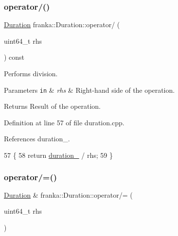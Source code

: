\subsubsection{\texorpdfstring{operator/()}{operator/()}\hspace{0.1cm}{\footnotesize\ttfamily [2/2]}}
{\footnotesize\ttfamily \hyperlink{classfranka_1_1Duration}{Duration} franka\+::\+Duration\+::operator/ (\begin{DoxyParamCaption}\item[{uint64\+\_\+t}]{rhs }\end{DoxyParamCaption}) const\hspace{0.3cm}{\ttfamily [noexcept]}}

Performs division.


\begin{DoxyParams}[1]{Parameters}
\mbox{\tt in}  & {\em rhs} & Right-\/hand side of the operation.\\
\hline
\end{DoxyParams}
\begin{DoxyReturn}{Returns}
Result of the operation. 
\end{DoxyReturn}


Definition at line 57 of file duration.\+cpp.



References duration\+\_\+.


\begin{DoxyCode}
57                                                         \{
58   \textcolor{keywordflow}{return} \hyperlink{classfranka_1_1Duration_ae446c403b200f0dbf92fb51ca21e82ff}{duration\_} / rhs;
59 \}
\end{DoxyCode}
\mbox{\label{classfranka_1_1Duration_a827f1d0177d06f51c55e56f540db02f8}} 
\subsubsection{\texorpdfstring{operator/=()}{operator/=()}}
{\footnotesize\ttfamily \hyperlink{classfranka_1_1Duration}{Duration} \& franka\+::\+Duration\+::operator/= (\begin{DoxyParamCaption}\item[{uint64\+\_\+t}]{rhs }\end{DoxyParamCaption})\hspace{0.3cm}{\ttfamily [noexcept]}}

